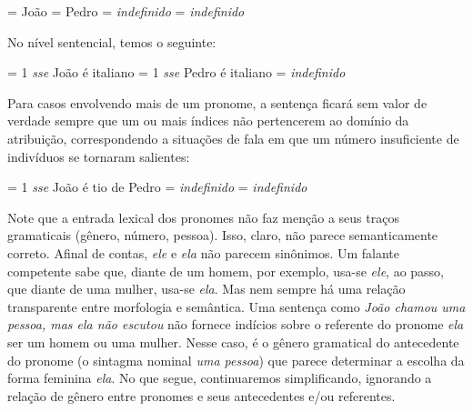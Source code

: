 \begin{exe}
	\ex
	\begin{xlist}
		\ex {} = João
		\ex {} = Pedro
		\ex {} = \textit{indefinido}
		\ex {}\gvaz = \textit{indefinido}  
	\end{xlist}
\end{exe}

\n No nível sentencial, temos o seguinte:

\begin{exe}
	\ex
	\begin{xlist}
		\ex {} = 1 \textit{sse} João é italiano
		\ex {} = 1 \textit{sse} Pedro é italiano
		\ex {}\gvaz = \textit{indefinido}  
	\end{xlist}
\end{exe}


Para casos envolvendo mais de um pronome, a sentença ficará sem
valor de verdade sempre que um ou mais índices não pertencerem ao
domínio da atribuição, correspondendo a situações de fala em
que um número insuficiente de indivíduos se tornaram salientes:

\begin{exe}
	\ex
	\begin{xlist}
		\ex {} = 1 \textit{sse} João é tio de Pedro
		\ex {} = \textit{indefinido}
		\ex {}\gvaz = \textit{indefinido}  
	\end{xlist}
\end{exe}

Note que a entrada lexical dos pronomes não faz menção a seus traços gramaticais (gênero, número, pessoa). Isso, claro, não parece semanticamente correto. Afinal de contas, \textit{ele} e \textit{ela} não parecem sinônimos. Um falante competente sabe que, diante de um homem, por exemplo, usa-se \textit{ele}, ao passo, que diante de uma mulher, usa-se \textit{ela}. Mas nem sempre há uma relação transparente entre morfologia e semântica. Uma sentença como \textit{João chamou uma pessoa, mas ela não escutou} não fornece indícios sobre o referente do pronome \textit{ela} ser um homem ou uma mulher. Nesse caso, é o gênero gramatical do antecedente do pronome (o sintagma nominal \textit{uma pessoa}) que parece determinar a escolha da forma feminina \textit{ela}. No que segue, continuaremos simplificando, ignorando a relação de gênero entre pronomes e seus antecedentes e/ou referentes.

